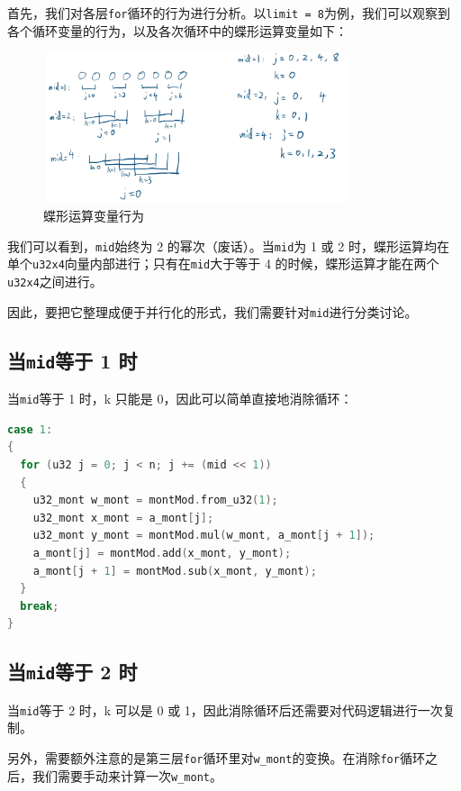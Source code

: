 \documentclass[a4paper]{article}
\begin{document}
首先，我们对各层\texttt{for}循环的行为进行分析。以\texttt{limit = 8}为例，我们可以观察到各个循环变量的行为，以及各次循环中的蝶形运算变量如下：

\begin{figure}[h]
    \centering
    \includegraphics[width=0.8\textwidth]{image/1.png}
    \caption{蝶形运算变量行为}
\end{figure}

我们可以看到，\texttt{mid}始终为 2 的幂次（废话）。当\texttt{mid}为 1 或 2 时，蝶形运算均在单个\texttt{u32x4}向量内部进行；只有在\texttt{mid}大于等于 4 的时候，蝶形运算才能在两个\texttt{u32x4}之间进行。

因此，要把它整理成便于并行化的形式，我们需要针对\texttt{mid}进行分类讨论。

\subsection{当\texttt{mid}等于 1 时}

当\texttt{mid}等于 1 时，k 只能是 0，因此可以简单直接地消除循环：

\begin{lstlisting}[language=C++]
case 1:
{
  for (u32 j = 0; j < n; j += (mid << 1))
  {
    u32_mont w_mont = montMod.from_u32(1);
    u32_mont x_mont = a_mont[j];
    u32_mont y_mont = montMod.mul(w_mont, a_mont[j + 1]);
    a_mont[j] = montMod.add(x_mont, y_mont);
    a_mont[j + 1] = montMod.sub(x_mont, y_mont);
  }
  break;
}
\end{lstlisting}

\subsection{当\texttt{mid}等于 2 时}

当\texttt{mid}等于 2 时，k 可以是 0 或 1，因此消除循环后还需要对代码逻辑进行一次复制。

另外，需要额外注意的是第三层\texttt{for}循环里对\texttt{w\_mont}的变换。在消除\texttt{for}循环之后，我们需要手动来计算一次\texttt{w\_mont}。
\end{document}
